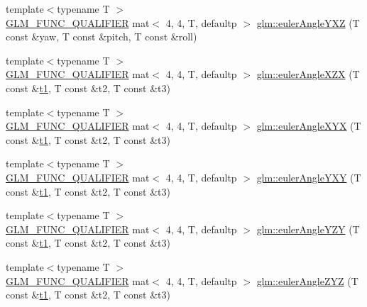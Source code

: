 \begin{DoxyCompactItemize}
\item 
{\footnotesize template$<$typename T $>$ }\\\mbox{\hyperlink{setup_8hpp_a33fdea6f91c5f834105f7415e2a64407}{G\+L\+M\+\_\+\+F\+U\+N\+C\+\_\+\+Q\+U\+A\+L\+I\+F\+I\+ER}} mat$<$ 4, 4, T, defaultp $>$ \mbox{\hyperlink{group__gtx__euler__angles_gab8ba99a9814f6d9edf417b6c6d5b0c10}{glm\+::euler\+Angle\+Y\+XZ}} (T const \&yaw, T const \&pitch, T const \&roll)
\item 
{\footnotesize template$<$typename T $>$ }\\\mbox{\hyperlink{setup_8hpp_a33fdea6f91c5f834105f7415e2a64407}{G\+L\+M\+\_\+\+F\+U\+N\+C\+\_\+\+Q\+U\+A\+L\+I\+F\+I\+ER}} mat$<$ 4, 4, T, defaultp $>$ \mbox{\hyperlink{group__gtx__euler__angles_ga60171c79a17aec85d7891ae1d1533ec9}{glm\+::euler\+Angle\+X\+ZX}} (T const \&\mbox{\hyperlink{_s_d_l__opengl__glext_8h_af48031a37b713afa3b0d0d7d29653d7c}{t1}}, T const \&t2, T const \&t3)
\item 
{\footnotesize template$<$typename T $>$ }\\\mbox{\hyperlink{setup_8hpp_a33fdea6f91c5f834105f7415e2a64407}{G\+L\+M\+\_\+\+F\+U\+N\+C\+\_\+\+Q\+U\+A\+L\+I\+F\+I\+ER}} mat$<$ 4, 4, T, defaultp $>$ \mbox{\hyperlink{group__gtx__euler__angles_ga29bd0787a28a6648159c0d6e69706066}{glm\+::euler\+Angle\+X\+YX}} (T const \&\mbox{\hyperlink{_s_d_l__opengl__glext_8h_af48031a37b713afa3b0d0d7d29653d7c}{t1}}, T const \&t2, T const \&t3)
\item 
{\footnotesize template$<$typename T $>$ }\\\mbox{\hyperlink{setup_8hpp_a33fdea6f91c5f834105f7415e2a64407}{G\+L\+M\+\_\+\+F\+U\+N\+C\+\_\+\+Q\+U\+A\+L\+I\+F\+I\+ER}} mat$<$ 4, 4, T, defaultp $>$ \mbox{\hyperlink{group__gtx__euler__angles_ga750fba9894117f87bcc529d7349d11de}{glm\+::euler\+Angle\+Y\+XY}} (T const \&\mbox{\hyperlink{_s_d_l__opengl__glext_8h_af48031a37b713afa3b0d0d7d29653d7c}{t1}}, T const \&t2, T const \&t3)
\item 
{\footnotesize template$<$typename T $>$ }\\\mbox{\hyperlink{setup_8hpp_a33fdea6f91c5f834105f7415e2a64407}{G\+L\+M\+\_\+\+F\+U\+N\+C\+\_\+\+Q\+U\+A\+L\+I\+F\+I\+ER}} mat$<$ 4, 4, T, defaultp $>$ \mbox{\hyperlink{group__gtx__euler__angles_ga5e5e40abc27630749b42b3327c76d6e4}{glm\+::euler\+Angle\+Y\+ZY}} (T const \&\mbox{\hyperlink{_s_d_l__opengl__glext_8h_af48031a37b713afa3b0d0d7d29653d7c}{t1}}, T const \&t2, T const \&t3)
\item 
{\footnotesize template$<$typename T $>$ }\\\mbox{\hyperlink{setup_8hpp_a33fdea6f91c5f834105f7415e2a64407}{G\+L\+M\+\_\+\+F\+U\+N\+C\+\_\+\+Q\+U\+A\+L\+I\+F\+I\+ER}} mat$<$ 4, 4, T, defaultp $>$ \mbox{\hyperlink{group__gtx__euler__angles_gacd795f1dbecaf74974f9c76bbcca6830}{glm\+::euler\+Angle\+Z\+YZ}} (T const \&\mbox{\hyperlink{_s_d_l__opengl__glext_8h_af48031a37b713afa3b0d0d7d29653d7c}{t1}}, T const \&t2, T const \&t3)

\end{DoxyCompactItemize}
